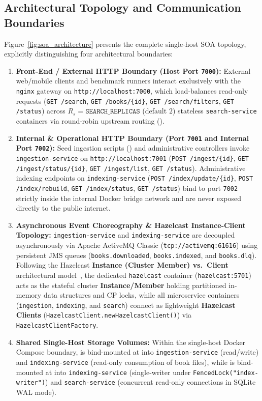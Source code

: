\documentclass[10pt,a4paper]{article}
\begin{document}
\subsection{Architectural Topology and Communication Boundaries}
Figure~\ref{fig:soa_architecture} presents the complete single-host SOA topology, explicitly distinguishing four architectural boundaries:
\begin{enumerate}[leftmargin=*,nosep]
    \item \textbf{Front-End / External HTTP Boundary (Host Port \texttt{7000}):} External web/mobile clients and benchmark runners interact exclusively with the \texttt{nginx} gateway on \texttt{http://localhost:7000}, which load-balances read-only requests (\texttt{GET /search}, \texttt{GET /books/\{id\}}, \texttt{GET /search/filters}, \texttt{GET /status}) across $R_s = \texttt{SEARCH\_REPLICAS}$ (default $2$) stateless \texttt{search-service} containers via round-robin upstream routing ().
    \item \textbf{Internal \& Operational HTTP Boundary (Port \texttt{7001} and Internal Port \texttt{7002}):} Seed ingestion scripts () and administrative controllers invoke \texttt{ingestion-service} on \texttt{http://localhost:7001} (\texttt{POST /ingest/\{id\}}, \texttt{GET /ingest/status/\{id\}}, \texttt{GET /ingest/list}, \texttt{GET /status}). Administrative indexing endpoints on \texttt{indexing-service} (\texttt{POST /index/update/\{id\}}, \texttt{POST /index/rebuild}, \texttt{GET /index/status}, \texttt{GET /status}) bind to port \texttt{7002} strictly inside the internal Docker bridge network and are never exposed directly to the public internet.
    \item \textbf{Asynchronous Event Choreography \& Hazelcast Instance-Client Topology:} \texttt{ingestion-service} and \texttt{indexing-service} are decoupled asynchronously via Apache ActiveMQ Classic (\texttt{tcp://activemq:61616}) using persistent JMS queues (\texttt{books.downloaded}, \texttt{books.indexed}, and \texttt{books.dlq}). Following the Hazelcast \textbf{Instance (Cluster Member) vs.\ Client} architectural model~\cite{hazelcast_docs}, the dedicated \texttt{hazelcast} container (\texttt{hazelcast:5701}) acts as the stateful cluster \textbf{Instance/Member} holding partitioned in-memory data structures and CP locks, while all microservice containers (\texttt{ingestion}, \texttt{indexing}, and \texttt{search}) connect as lightweight \textbf{Hazelcast Clients} (\texttt{HazelcastClient.newHazelcastClient()}) via \texttt{HazelcastClientFactory}.
    \item \textbf{Shared Single-Host Storage Volumes:} Within the single-host Docker Compose boundary,  is bind-mounted at  into \texttt{ingestion-service} (read/write) and \texttt{indexing-service} (read-only consumption of book files), while  is bind-mounted at  into \texttt{indexing-service} (single-writer under \texttt{FencedLock("index-writer")}) and \texttt{search-service} (concurrent read-only connections in SQLite WAL mode).
\end{enumerate}
\end{document}
